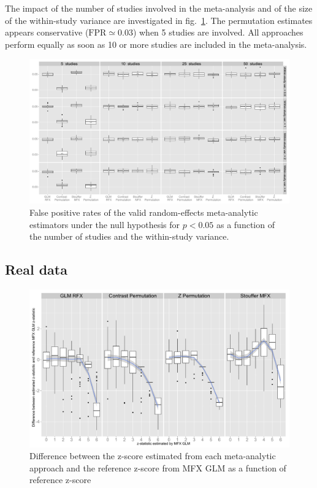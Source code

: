 \documentclass{llncs}
\begin{document}
The impact of the number of studies involved in the meta-analysis and of the size of the within-study variance are investigated in fig.~\ref{fig_fpr_valid}. The permutation estimates appears conservative ($\text{FPR}\simeq 0.03$) when 5 studies are involved. All approaches perform equally as soon as 10 or more studies are included in the meta-analysis. 
\begin{figure}[ht]
	\centering
	\includegraphics[width=\linewidth]{./Rplot_valids.pdf}
	\caption{False positive rates of the valid random-effects meta-analytic estimators under the null hypothesis for $p<0.05$ as a function of the number of studies and the within-study variance.}
	\label{fig_fpr_valid}
\end{figure}


\subsection{Real data}

\begin{figure}[ht]
	\centering
	\includegraphics[width=\linewidth]{./Rplot_realdata.pdf}
	\caption{Difference between the z-score estimated from each meta-analytic approach and the reference z-score from MFX GLM as a function of reference z-score}
	\label{fig_realdata}
\end{figure}
\end{document}
